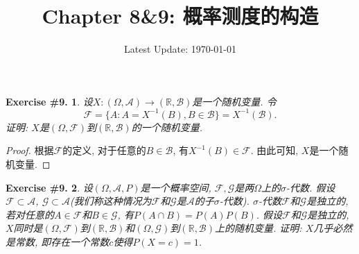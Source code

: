 \documentclass[UTF8, a4paper]{article}
\title{Chapter 8\&9: 概率测度的构造}
\author{}
\date{Latest Update: \today}
\newtheorem{exercise}{Exercise \#9.}
\begin{document}
\maketitle

\begin{framed}
\begin{exercise}
设\(X: (\Omega, \mathcal{A}) \to (\mathbb{R}, \mathcal{B})\)是一个随机变量. 令
$$
\mathcal{F} = \{A: A = X^{-1}(B) , B \in \mathcal{B}\} = X^{-1}(\mathcal{B}).
$$
证明: \(X\)是\((\Omega, \mathcal{F})\)到\((\mathbb{R}, \mathcal{B})\)的一个随机变量.
\end{exercise}
\end{framed}

\begin{proof}
根据\(\mathcal{F}\)的定义, 对于任意的\(B \in \mathcal{B}\), 有\(X^{-1}(B) \in \mathcal{F}\). 由此可知, \(X\)是一个随机变量.
\end{proof}



\begin{framed}
\begin{exercise}
设\((\Omega, \mathcal{A}, P)\)是一个概率空间, \(\mathcal{F}, \mathcal{G}\)是两\(\Omega\)上的\(\sigma\)-代数.
假设\(\mathcal{F} \subset \mathcal{A}\), \(\mathcal{G} \subset \mathcal{A}\)(我们称这种情况为\(\mathcal{F}\)和\(\mathcal{G}\)是\(\mathcal{A}\)的子\(\sigma\)-代数).
\(\sigma\)-代数\(\mathcal{F}\)和\(\mathcal{G}\)是独立的, 若对任意的\(A \in \mathcal{F}\)和\(B \in \mathcal{G}\), 有\(P(A \cap B) = P(A)P(B)\).
假设\(\mathcal{F}\)和\(\mathcal{G}\)是独立的, \(X\)同时是\((\Omega, \mathcal{F})\)到\((\mathbb{R}, \mathcal{B})\)和\((\Omega, \mathcal{G})\)到\((\mathbb{R}, \mathcal{B})\)上的随机变量.
证明: \(X\)几乎必然是常数, 即存在一个常数\(c\)使得\(P(X = c) = 1\).
\end{exercise}
\end{framed}
\end{document}

